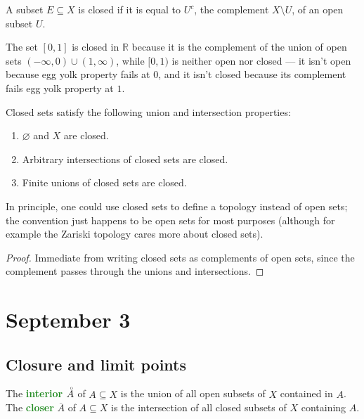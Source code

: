 \documentclass[11pt]{scrartcl}
\providecommand{\ol}{\overline}
\providecommand{\RR}{\mathbb R}
\providecommand{\ii}{\item}
\providecommand{\vocab}[1]{{\textbf{\textcolor{ForestGreen}{#1}}}}
\begin{document}
\begin{definition}
    \label{def:closedset}
    A subset $E\subseteq X$ is closed if it is equal to $U^c$,
    the complement $X\setminus U$, of an open subset $U$.
\end{definition}

\begin{example}
    The set $[0,1]$ is closed in $\RR$ because it is the complement of
    the union of open sets $(-\infty,0)\cup(1,\infty)$,
    while $[0,1)$ is neither open nor closed --- it isn't open
    because egg yolk property fails at $0$,
    and it isn't closed because its complement fails egg yolk property at $1$.
\end{example}

\begin{prop}
    \label{prop:closedset-intersectionunion}
    Closed sets satisfy the following union and intersection properties:
    \begin{enumerate}[(1)]
	\ii $\varnothing$ and $X$ are closed.
        \ii Arbitrary intersections of closed sets are closed.
	\ii Finite unions of closed sets are closed.
    \end{enumerate}
    In principle, one could use closed sets to define a topology
    instead of open sets; the convention just happens to be open sets
    for most purposes (although for example the Zariski topology
    cares more about closed sets).
\end{prop}

\begin{proof}
    Immediate from writing closed sets as complements of open sets,
    since the complement passes through the unions and intersections.
\end{proof}

\section{September 3}\label{sec:sep03}

\subsection{Closure and limit points}

\begin{definition}
    \label{def:interior-closure}
    The \vocab{interior} $\accentset{\circ}{A}$ of $A\subseteq X$
    is the union of all open subsets of $X$ contained in $A$.
    The \vocab{closer} $\ol A$ of $A\subseteq X$
    is the intersection of all closed subsets of $X$ containing $A$.
\end{definition}
\end{document}
